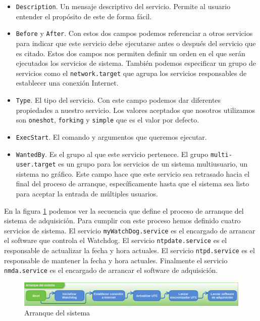 	\begin{itemize}
		\item	\texttt{Description}. Un mensaje descriptivo del servicio. Permite al usuario entender el propósito de este de forma fácil.
		\item	\texttt{Before} y \texttt{After}. Con estos dos campos podemos referenciar a otros servicios para indicar que este servicio
		  	debe ejecutarse antes o después del servicio que es citado. Estos dos campos nos permiten definir un orden en el que serán
		  	ejecutados los servicios de sistema. También podemos especificar un grupo de servicios como el \texttt{network.target} que
			agrupa los servicios responsables de establecer una conexión Internet. 
		\item	\texttt{Type}. El tipo del servicio. Con este campo podemos dar diferentes propiedades a nuestro servicio. Los valores
		  	aceptados que nosotros utilizamos son \texttt{oneshot}, \texttt{forking} y \texttt{simple} que es el valor por defecto.
		\item	\texttt{ExecStart}. El comando y argumentos que queremos ejecutar.
		\item	\texttt{WantedBy}. Es el grupo al que este servicio pertenece. El grupo \texttt{multi-user.target} es un grupo para los
			servicios de un sistema multiusuario, un sistema no gráfico. Este campo hace que este servicio sea retrasado hacia el final
			del proceso de arranque, específicamente hasta que el sistema sea listo para aceptar la entrada de múltiples usuarios. 
	\end{itemize}
	\par
	En la figura \ref{fig:boot} podemos ver la secuencia que define el proceso de arranque del sistema de adquisición. Para cumplir con este
	proceso hemos definido cuatro servicios de sistema. El servicio \texttt{myWatchDog.service} es el encargado de arrancar el software que
	controla el Watchdog. El servicio \texttt{ntpdate.service} es el responsable de actualizar la fecha y hora actuales. El servicio
	\texttt{ntpd.service} es el responsable de mantener la fecha y hora actuales. Finalmente el servicio \texttt{nmda.service} es el encargado de
	arrancar el software de adquisición.
	\begin{figure}[h]
		\centering
		\includegraphics[keepaspectratio, width=1\textwidth]{./img/boot.png}
		\caption{Arranque del sistema}   
		\label{fig:boot}
	\end{figure}
